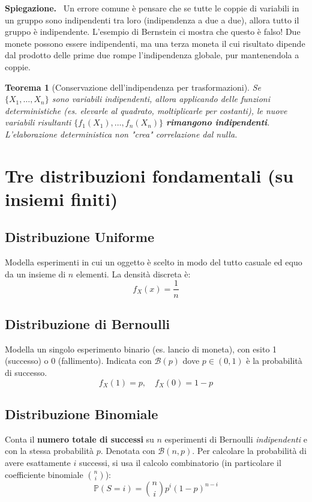 \documentclass[11pt, a4paper]{report}
\theoremstyle{plain}
\newtheorem{theorem}{Teorema}[chapter]
\theoremstyle{definition}
\theoremstyle{remark}
\newenvironment{spiegazione}[1][Spiegazione]
{\begin{mdframed}[backgroundcolor=green!5, linecolor=green!50, linewidth=2pt, topline=false, rightline=false, bottomline=false]
\textbf{\textsf{#1.}}\ }
{\end{mdframed}}
\newcommand{\PP}{\mathbb{P}}
\newcommand{\1}{\mathbf{1}}
\begin{document}
\begin{spiegazione}
    Un errore comune è pensare che se tutte le coppie di variabili in un gruppo sono indipendenti tra loro (indipendenza a due a due), allora tutto il gruppo è indipendente. L'esempio di Bernstein ci mostra che questo è falso! Due monete possono essere indipendenti, ma una terza moneta il cui risultato dipende dal prodotto delle prime due rompe l'indipendenza globale, pur mantenendola a coppie.
\end{spiegazione}

\begin{theorem}[Conservazione dell'indipendenza per trasformazioni]
Se $\{X_1, \dots, X_n\}$ sono variabili indipendenti, allora applicando delle funzioni deterministiche (es. elevarle al quadrato, moltiplicarle per costanti), le nuove variabili risultanti $\{f_1(X_1), \dots, f_n(X_n)\}$ \textbf{rimangono indipendenti}. L'elaborazione deterministica non "crea" correlazione dal nulla.
\end{theorem}

\section{Tre distribuzioni fondamentali (su insiemi finiti)}

\subsection{Distribuzione Uniforme}
Modella esperimenti in cui un oggetto è scelto in modo del tutto casuale ed equo da un insieme di $n$ elementi.
La densità discreta è:
\[ f_X(x) = \frac{1}{n} \]

\subsection{Distribuzione di Bernoulli}
Modella un singolo esperimento binario (es. lancio di moneta), con esito 1 (successo) o 0 (fallimento).
Indicata con $\mathcal{B}(p)$ dove $p \in (0,1)$ è la probabilità di successo.
\[ f_X(1) = p, \quad f_X(0) = 1-p \]

\subsection{Distribuzione Binomiale}
Conta il \textbf{numero totale di successi} su $n$ esperimenti di Bernoulli \emph{indipendenti} e con la stessa probabilità $p$.
Denotata con $\mathcal{B}(n, p)$.
Per calcolare la probabilità di avere esattamente $i$ successi, si usa il calcolo combinatorio (in particolare il coefficiente binomiale $\binom{n}{i}$):
\[ \PP(S = i) = \binom{n}{i} p^i (1-p)^{n-i} \]
\end{document}
